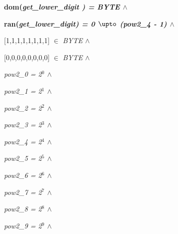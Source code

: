 \hspace*{0.20in}\bf dom\rm (\it get\_lower\_digit \rm ) \rm = \it BYTE  $\land$ 

\hspace*{0.20in}\bf ran\rm (\it get\_lower\_digit\rm ) \rm = \rm 0 $\upto$ \rm (\it pow2\_4 \rm - \rm 1\rm )  $\land$ 

\hspace*{0.20in}

\hspace*{0.20in}

\hspace*{0.20in}\rm \rm [\rm 1\rm ,\rm 1\rm ,\rm 1\rm ,\rm 1\rm ,\rm 1\rm ,\rm 1\rm ,\rm 1\rm ,\rm 1\rm \rm ]  $\in$  \it BYTE  $\land$ \hspace*{0.10in}

\hspace*{0.20in}\rm \rm [\rm 0\rm ,\rm 0\rm ,\rm 0\rm ,\rm 0\rm ,\rm 0\rm ,\rm 0\rm ,\rm 0\rm ,\rm 0\rm \rm ]  $\in$  \it BYTE  $\land$ 

\hspace*{0.20in}

\hspace*{0.20in}

\hspace*{0.20in}\it pow2\_0 \rm = \rm 2$^{0}$  $\land$ 

\hspace*{0.20in}\it pow2\_1 \rm = \rm 2$^{1}$  $\land$ 

\hspace*{0.20in}\it pow2\_2 \rm = \rm 2$^{2}$  $\land$ 

\hspace*{0.20in}\it pow2\_3 \rm = \rm 2$^{3}$  $\land$ 

\hspace*{0.20in}\it pow2\_4 \rm = \rm 2$^{4}$  $\land$ 

\hspace*{0.20in}\it pow2\_5 \rm = \rm 2$^{5}$  $\land$ 

\hspace*{0.20in}\it pow2\_6 \rm = \rm 2$^{6}$  $\land$ 

\hspace*{0.20in}\it pow2\_7 \rm = \rm 2$^{7}$  $\land$ 

\hspace*{0.20in}\it pow2\_8 \rm = \rm 2$^{8}$  $\land$ 

\hspace*{0.20in}\it pow2\_9 \rm = \rm 2$^{9}$  $\land$ \hspace*{0.20in}

